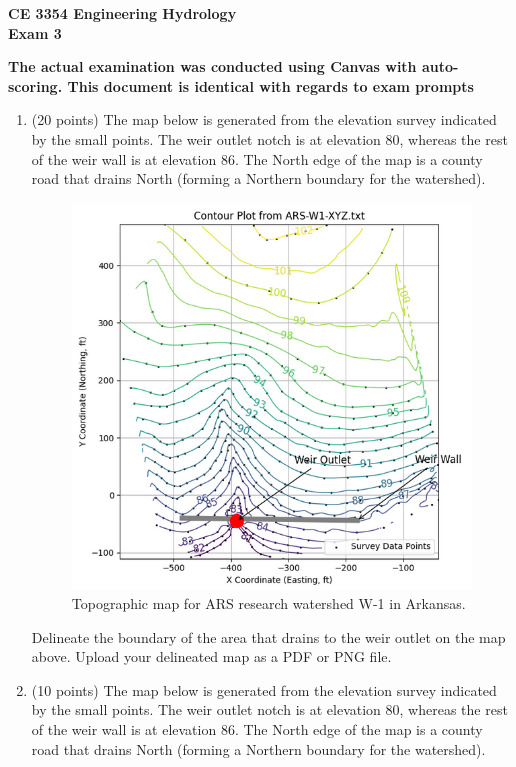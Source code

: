 \documentclass[12pt]{article}
\begin{document}
\begin{center}
{\textbf{{ CE 3354 Engineering Hydrology} \\ {Exam 3}}}
\end{center}
\textbf{The actual examination was conducted using Canvas with auto-scoring.  This document is identical with regards to exam prompts}

\begin{enumerate}

\item (20 points) The map below is generated from the elevation survey indicated by the small points.  The weir outlet notch is at elevation 80, whereas the rest of the weir wall is at elevation 86.  The North edge of the map is a county road that drains North (forming a Northern boundary for the watershed).   

\begin{figure}[h!] %
   \centering
   \includegraphics[width=5in]{ARS-W1_TopoMap.png} 
   \caption{Topographic map for ARS research watershed W-1 in Arkansas.}
   \label{fig:ARS-W1_TopoMap1}
\end{figure}

Delineate the boundary of the area that drains to the weir outlet on the map above.  Upload your delineated map as a PDF or PNG file.

\clearpage
\item (10 points) The map below is generated from the elevation survey indicated by the small points.  The weir outlet notch is at elevation 80, whereas the rest of the weir wall is at elevation 86.  The North edge of the map is a county road that drains North (forming a Northern boundary for the watershed).   


\end{enumerate}
\end{document}
